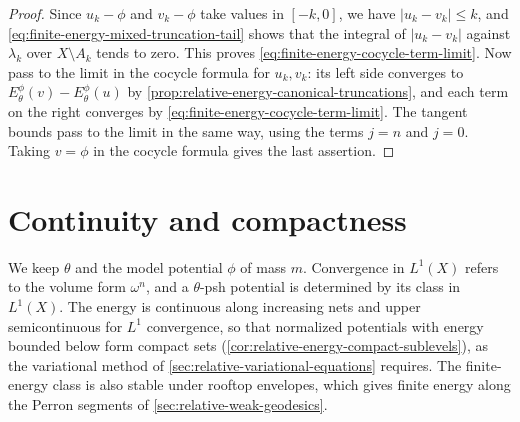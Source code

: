 \begin{proof}
Since $u_k-\phi$ and $v_k-\phi$ take values in $[-k,0]$, we have $|u_k-v_k|\leq k$, and \eqref{eq:finite-energy-mixed-truncation-tail} shows that the integral of $|u_k-v_k|$ against $\lambda_k$ over $X\setminus A_k$ tends to zero. This proves \eqref{eq:finite-energy-cocycle-term-limit}. Now pass to the limit in the cocycle formula for $u_k,v_k$: its left side converges to $E_\theta^\phi(v)-E_\theta^\phi(u)$ by \cref{prop:relative-energy-canonical-truncations}, and each term on the right converges by \eqref{eq:finite-energy-cocycle-term-limit}. The tangent bounds pass to the limit in the same way, using the terms $j=n$ and $j=0$. Taking $v=\phi$ in the cocycle formula gives the last assertion.
\end{proof}

\section{Continuity and compactness}
\label{sec:relative-energy-stability}
We keep $\theta$ and the model potential $\phi$ of mass $m$. Convergence in $L^1(X)$ refers to the volume form $\omega^n$, and a $\theta$-psh potential is determined by its class in $L^1(X)$. The energy is continuous along increasing nets and upper semicontinuous for $L^1$ convergence, so that normalized potentials with energy bounded below form compact sets (\cref{cor:relative-energy-compact-sublevels}), as the variational method of \cref{sec:relative-variational-equations} requires. The finite-energy class is also stable under rooftop envelopes, which gives finite energy along the Perron segments of \cref{sec:relative-weak-geodesics}.

